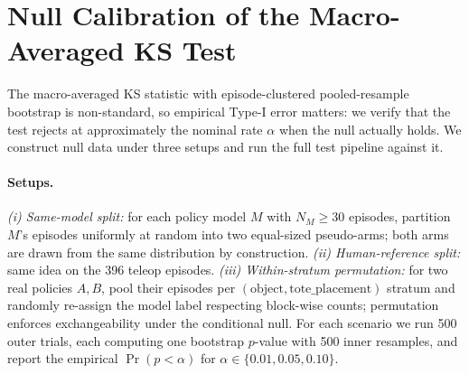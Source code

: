 \documentclass{article}
\begin{document}
\section{Null Calibration of the Macro-Averaged KS Test}\label{app:nullcal}

The macro-averaged KS statistic with episode-clustered pooled-resample bootstrap is non-standard, so empirical Type-I error matters: we verify that the test rejects at approximately the nominal rate $\alpha$ when the null actually holds. We construct null data under three setups and run the full test pipeline against it.

\paragraph{Setups.} \emph{(i) Same-model split:} for each policy model $M$ with $N_M \ge 30$ episodes, partition $M$'s episodes uniformly at random into two equal-sized pseudo-arms; both arms are drawn from the same distribution by construction. \emph{(ii) Human-reference split:} same idea on the 396 teleop episodes. \emph{(iii) Within-stratum permutation:} for two real policies $A, B$, pool their episodes per $(\text{object}, \text{tote\_placement})$ stratum and randomly re-assign the model label respecting block-wise counts; permutation enforces exchangeability under the conditional null. For each scenario we run 500 outer trials, each computing one bootstrap $p$-value with 500 inner resamples, and report the empirical $\Pr(p < \alpha)$ for $\alpha \in \{0.01, 0.05, 0.10\}$.
\end{document}

